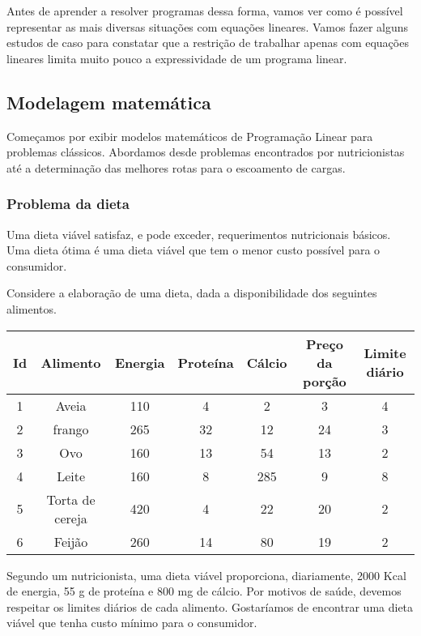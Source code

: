 \documentclass[]{article}
\numberwithin{equation}{section}
\begin{document}
Antes de aprender a resolver programas dessa forma, vamos ver como é possível representar as mais diversas situações com equações lineares.
Vamos fazer alguns estudos de caso para constatar que a restrição de trabalhar apenas com equações lineares limita muito pouco a expressividade de um programa linear.

\subsection{Modelagem matemática}

Começamos por exibir modelos matemáticos de Programação Linear para problemas clássicos.
Abordamos desde problemas encontrados por nutricionistas até a determinação das melhores rotas para o escoamento de cargas.

\subsubsection{Problema da dieta}

Uma dieta viável satisfaz, e pode exceder, requerimentos nutricionais básicos.
Uma dieta ótima é uma dieta viável que tem o menor custo possível para o consumidor.

Considere a elaboração de uma dieta, dada a disponibilidade dos seguintes alimentos.

\begin{center}
  \begin{tabular}{| c | c | c | c | c | c | c |}
    \hline
    Id & Alimento & Energia & Proteína & Cálcio & Preço da porção & Limite diário \\
    \hline
    1 & Aveia & 110 & 4 & 2 & 3 & 4 \\
    \hline
    2 & frango & 265 & 32 & 12 & 24 & 3 \\
    \hline
    3 & Ovo & 160 & 13 & 54 & 13 & 2 \\
    \hline
    4 & Leite & 160 & 8 & 285 & 9 & 8 \\
    \hline
    5 & Torta de cereja & 420 & 4 & 22 & 20 & 2 \\
    \hline
    6 & Feijão & 260 & 14 & 80 & 19 & 2 \\
    \hline
  \end{tabular}
\end{center}

Segundo um nutricionista, uma dieta viável proporciona, diariamente, 2000 Kcal de energia, 55 g de proteína e 800 mg de cálcio.
Por motivos de saúde, devemos respeitar os limites diários de cada alimento.
Gostaríamos de encontrar uma dieta viável que tenha custo mínimo para o consumidor.
\end{document}
